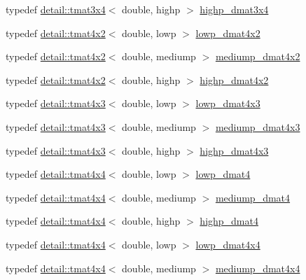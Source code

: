 \begin{DoxyCompactItemize}
\item 
typedef \hyperlink{structglm_1_1detail_1_1tmat3x4}{detail\+::tmat3x4}$<$ double, highp $>$ \hyperlink{group__core__precision_gaff199c8d04a8edb92ed43283e8694c59}{highp\+\_\+dmat3x4}
\item 
typedef \hyperlink{structglm_1_1detail_1_1tmat4x2}{detail\+::tmat4x2}$<$ double, lowp $>$ \hyperlink{group__core__precision_ga28a7ef670069c3707f19b9de1039517e}{lowp\+\_\+dmat4x2}
\item 
typedef \hyperlink{structglm_1_1detail_1_1tmat4x2}{detail\+::tmat4x2}$<$ double, mediump $>$ \hyperlink{group__core__precision_ga03056b616496470371473cd5df4dc1f8}{mediump\+\_\+dmat4x2}
\item 
typedef \hyperlink{structglm_1_1detail_1_1tmat4x2}{detail\+::tmat4x2}$<$ double, highp $>$ \hyperlink{group__core__precision_gaa4fb1ed350a6cd053abb9b093d13ce0d}{highp\+\_\+dmat4x2}
\item 
typedef \hyperlink{structglm_1_1detail_1_1tmat4x3}{detail\+::tmat4x3}$<$ double, lowp $>$ \hyperlink{group__core__precision_gabc1be51eb0cae7cd4b1d6483a954c35d}{lowp\+\_\+dmat4x3}
\item 
typedef \hyperlink{structglm_1_1detail_1_1tmat4x3}{detail\+::tmat4x3}$<$ double, mediump $>$ \hyperlink{group__core__precision_gafa1ba33d2748737129cde471fedbf9c5}{mediump\+\_\+dmat4x3}
\item 
typedef \hyperlink{structglm_1_1detail_1_1tmat4x3}{detail\+::tmat4x3}$<$ double, highp $>$ \hyperlink{group__core__precision_gaf8aeba0eecc5c651e0f06414b6e37754}{highp\+\_\+dmat4x3}
\item 
typedef \hyperlink{structglm_1_1detail_1_1tmat4x4}{detail\+::tmat4x4}$<$ double, lowp $>$ \hyperlink{group__core__precision_gaea69794db4e619881b77d37bf84b337e}{lowp\+\_\+dmat4}
\item 
typedef \hyperlink{structglm_1_1detail_1_1tmat4x4}{detail\+::tmat4x4}$<$ double, mediump $>$ \hyperlink{group__core__precision_ga73de517f040f7d50746bbe273a396685}{mediump\+\_\+dmat4}
\item 
typedef \hyperlink{structglm_1_1detail_1_1tmat4x4}{detail\+::tmat4x4}$<$ double, highp $>$ \hyperlink{group__core__precision_ga9a5d95e476d451d28d3939ac7f124baf}{highp\+\_\+dmat4}
\item 
typedef \hyperlink{structglm_1_1detail_1_1tmat4x4}{detail\+::tmat4x4}$<$ double, lowp $>$ \hyperlink{group__core__precision_gac762dec40f53114dfe6894499a2c9a79}{lowp\+\_\+dmat4x4}
\item 
typedef \hyperlink{structglm_1_1detail_1_1tmat4x4}{detail\+::tmat4x4}$<$ double, mediump $>$ \hyperlink{group__core__precision_gad64329d45b05417ccf0cc3c23f584d26}{mediump\+\_\+dmat4x4}

\end{DoxyCompactItemize}
